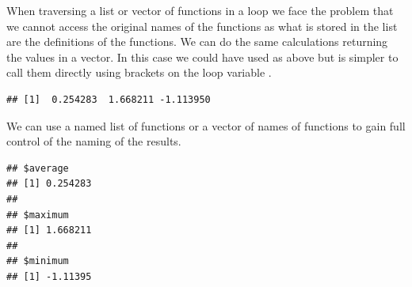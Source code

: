 \documentclass[krantz2]{krantz}\usepackage{knitr}%
\begin{document}
When traversing a list or vector of functions in a loop we face the problem that we cannot access the original names of the functions as what is stored in the list are the definitions of the functions. We can do the same calculations returning the values in a vector. In this case we could have used  as above but is simpler to call them directly using brackets on the loop variable .
\begin{knitrout}\footnotesize
{}\color{fgcolor}\begin{kframe}
\begin{alltt}
 \hlkwb{<-} \hlstd{()}
 \hlkwb{<-} 
   
    \hlkwb{<-}  
   \hlstd{\}}
\end{alltt}
\begin{verbatim}
## [1]  0.254283  1.668211 -1.113950
\end{verbatim}
\end{kframe}
\end{knitrout}

We can use a named list of functions or a vector of names of functions to gain full control of the naming of the results.
\begin{knitrout}\footnotesize
{}\color{fgcolor}\begin{kframe}
\begin{alltt}
 \hlkwb{<-} \hlstd{()}
 \hlkwb{<-} \hlstd{(}     
   
    \hlkwb{<-} 
   \hlstd{\}}
\end{alltt}
\begin{verbatim}
## $average
## [1] 0.254283
## 
## $maximum
## [1] 1.668211
## 
## $minimum
## [1] -1.11395
\end{verbatim}
\end{kframe}
\end{knitrout}
\end{document}
